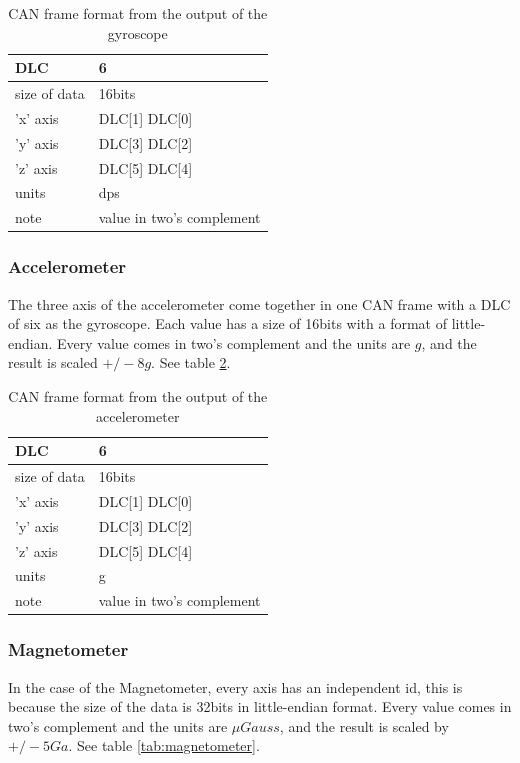 \documentclass[12pt]{report}%
\begin{document}
\begin{table}[h!]
\centering
\begin{tabular}{|l|l|}
	\hline
	DLC						&	6													\\	\hline
	size of data	&	16bits										\\	\hline
	'x' axis			&	DLC[1] DLC[0]							\\	\hline
	'y'	axis			&	DLC[3] DLC[2]							\\	\hline
	'z'	axis			&	DLC[5] DLC[4]							\\	\hline
	units					&	dps												\\	\hline
	note					& value in two's complement \\	\hline
\end{tabular}
\caption{\label{tab:gyroscope} CAN frame format from the output of the gyroscope}
\end{table}

\subsubsection{Accelerometer}
The three axis of the accelerometer come together in one CAN frame with a DLC of six as the gyroscope. Each value has a size of 16bits with a format of little-endian. Every value comes in two's complement and the units are $g$, and the result is scaled $+/-8g$. See table \ref{tab:accelerometer}.

\begin{table}[h!]
\centering
\begin{tabular}{|l|l|}
	\hline
	DLC						&	6													\\	\hline
	size of data	&	16bits										\\	\hline
	'x' axis			&	DLC[1] DLC[0]							\\	\hline
	'y'	axis			&	DLC[3] DLC[2]							\\	\hline
	'z'	axis			&	DLC[5] DLC[4]							\\	\hline
	units					&	g													\\	\hline
	note					& value in two's complement \\	\hline
\end{tabular}
\caption{\label{tab:accelerometer} CAN frame format from the output of the accelerometer}
\end{table}

\subsubsection{Magnetometer}
In the case of the Magnetometer, every axis has an independent id, this is because the size of the data is 32bits in little-endian format. Every value comes in two's complement and the units are $\mu Gauss$, and the result is scaled by $+/-5Ga$. See table \ref{tab:magnetometer}.
\end{document}
